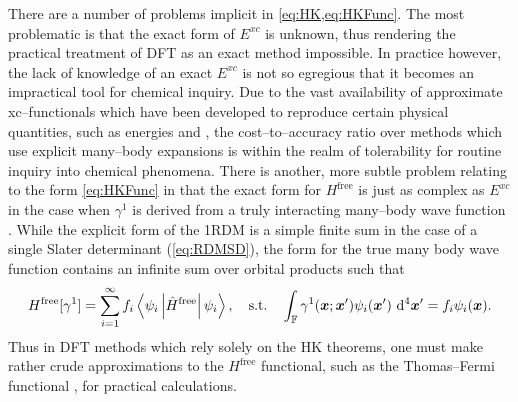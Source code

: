 There are a number of problems implicit in \cref{eq:HK,eq:HKFunc}. The most problematic is that the 
exact form of $E^{xc}$ is unknown, thus rendering the practical treatment of DFT as an exact method impossible. In
practice however, the lack of knowledge of an exact $E^{xc}$ is not so egregious that it becomes an impractical
tool for chemical inquiry. Due to the vast availability of approximate xc--functionals which have been developed to
reproduce certain physical quantities, such as energies and , the cost--to--accuracy ratio 
over methods which use explicit many--body expansions is within the realm of tolerability for routine inquiry into chemical 
phenomena. There is another, more subtle problem relating to the form \cref{eq:HKFunc} in that the exact form for
$H^\mathrm{free}$ is just as complex as $E^{xc}$ in the case when $\gamma^1$ is derived from a truly interacting
many--body wave function \cite{Yang89_book}. While the explicit form of the 1RDM is a simple finite sum
in the case of a single Slater determinant (\cref{eq:RDMSD}), the form for the true many body wave function
contains an infinite sum over orbital products such that
\begin{equation}
  H^\mathrm{free}[\gamma^1] = \sum_{i = 1}^\infty f_i \left\langle \psi_i \left\vert \hat{H}^\mathrm{free} \right\vert \psi_i \right\rangle, \quad \text{s.t.} \quad
  \int_{\mathbb{F}} \gamma^1(\boldsymbol{x};\boldsymbol{x}') \psi_i(\boldsymbol{x}') \,\,\mathrm{d}^4\boldsymbol{x}' = f_i\psi_i(\boldsymbol{x}).
\end{equation}
Thus in DFT methods which rely solely on the HK theorems, one must make rather crude approximations to the $H^\mathrm{free}$
functional, such as the Thomas--Fermi functional , for practical calculations.

